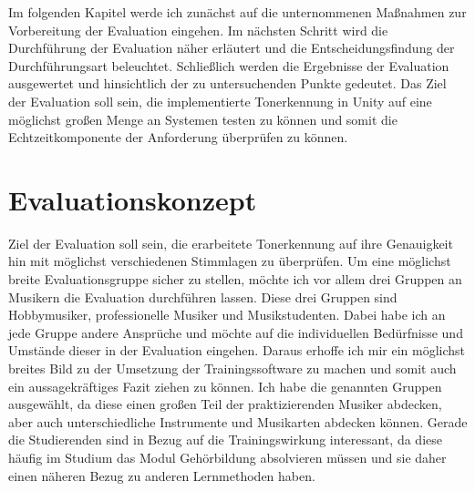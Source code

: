 Im folgenden Kapitel werde ich zunächst auf die unternommenen Maßnahmen zur Vorbereitung der Evaluation eingehen. Im nächsten Schritt wird die Durchführung der Evaluation näher erläutert und die Entscheidungsfindung der Durchführungsart beleuchtet. Schließlich werden die Ergebnisse der Evaluation ausgewertet und hinsichtlich der zu untersuchenden Punkte gedeutet.  Das Ziel der Evaluation soll sein, die implementierte Tonerkennung in Unity auf eine möglichst großen Menge an Systemen testen zu können und somit die Echtzeitkomponente der Anforderung überprüfen zu können. 
\section{Evaluationskonzept}
Ziel der Evaluation soll sein, die erarbeitete Tonerkennung auf ihre Genauigkeit hin mit möglichst verschiedenen Stimmlagen zu überprüfen. Um eine möglichst breite Evaluationsgruppe sicher zu stellen, möchte ich vor allem drei Gruppen an Musikern die Evaluation durchführen lassen. Diese drei Gruppen sind Hobbymusiker, professionelle Musiker und Musikstudenten. Dabei habe ich an jede Gruppe andere Ansprüche und möchte auf die individuellen Bedürfnisse und Umstände dieser in der Evaluation eingehen. Daraus erhoffe ich mir ein möglichst breites Bild zu der Umsetzung der Trainingssoftware zu machen und somit auch ein aussagekräftiges Fazit ziehen zu können.
Ich habe die genannten Gruppen ausgewählt, da diese einen großen Teil der praktizierenden Musiker abdecken, aber auch unterschiedliche Instrumente und Musikarten abdecken können. Gerade die Studierenden sind in Bezug auf die Trainingswirkung interessant, da diese häufig im Studium das Modul Gehörbildung absolvieren müssen und sie daher einen näheren Bezug zu anderen Lernmethoden haben. \\
